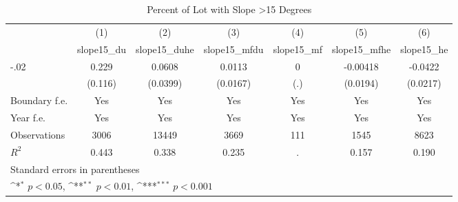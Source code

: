 \begin{table}[htbp]\centering
\def\sym#1{\ifmmode^{#1}\else\(^{#1}\)\fi}
\caption{Percent of Lot with Slope >15 Degrees}
\begin{tabular}{l*{6}{c}}
\hline\hline
                    &\multicolumn{1}{c}{(1)}&\multicolumn{1}{c}{(2)}&\multicolumn{1}{c}{(3)}&\multicolumn{1}{c}{(4)}&\multicolumn{1}{c}{(5)}&\multicolumn{1}{c}{(6)}\\
                    &\multicolumn{1}{c}{slope15\_du}&\multicolumn{1}{c}{slope15\_duhe}&\multicolumn{1}{c}{slope15\_mfdu}&\multicolumn{1}{c}{slope15\_mf}&\multicolumn{1}{c}{slope15\_mfhe}&\multicolumn{1}{c}{slope15\_he}\\
\hline
-.02                &       0.229         &      0.0608         &      0.0113         &           0         &    -0.00418         &     -0.0422         \\
                    &     (0.116)         &    (0.0399)         &    (0.0167)         &         (.)         &    (0.0194)         &    (0.0217)         \\
[1em]
Boundary f.e.       &         Yes         &         Yes         &         Yes         &         Yes         &         Yes         &         Yes         \\
[1em]
Year f.e.           &         Yes         &         Yes         &         Yes         &         Yes         &         Yes         &         Yes         \\
\hline
Observations        &        3006         &       13449         &        3669         &         111         &        1545         &        8623         \\
\(R^{2}\)           &       0.443         &       0.338         &       0.235         &           .         &       0.157         &       0.190         \\
\hline\hline
\multicolumn{7}{l}{\footnotesize Standard errors in parentheses}\\
\multicolumn{7}{l}{\footnotesize \sym{*} \(p<0.05\), \sym{**} \(p<0.01\), \sym{***} \(p<0.001\)}\\
\end{tabular}
\end{table}
